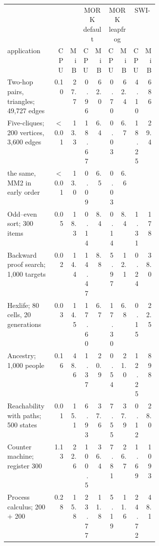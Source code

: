 \begin{center}
\small
\setlength{\tabcolsep}{3.5pt}
\begin{tabular}{@{}p{0.36\linewidth}rrrrrrrr@{}}
\toprule
 & \multicolumn{2}{c}{\CeTTa{}} & \multicolumn{2}{c}{MORK default} & \multicolumn{2}{c}{MORK leapfrog} & \multicolumn{2}{c}{SWI-\PeTTa{}} \\
\cmidrule(lr){2-3}\cmidrule(lr){4-5}\cmidrule(lr){6-7}\cmidrule(lr){8-9}
application & CPU & MiB & CPU & MiB & CPU & MiB & CPU & MiB \\
\midrule
Two-hop pairs, triangles; 49,727 edges & 0.10 & 27.7 & 0.96 & 62.0 & 0.70 & 62.4 & 4.10 & 686 \\
Five-cliques; 200 vertices, 3,600 edges & $<$0.01 & 13.3 & 18.67 & 6.4 & 0.03 & 6.7 & 18.25 & 29.4 \\
\quad the same, MM2 in early order & $<$0.01 & 13.0 & 0.09 & 6.5 & 0.03 & 6.6 &  &  \\
Odd--even sort; 300 items & 0.05 & 18.3 & 0.14 & 8.4 & 0.14 & 8.4 & 1.31 & 178 \\
Backward proof search; 1,000 targets & 0.02 & 14.4 & 14.47 & 8.8 & 5.97 & 12.1 & 0.24 & 38.0 \\
Hexlife; 80 cells, 20 generations & 0.03 & 14.5 & 17.60 & 6.7 & 17.30 & 6.8 & 0.15 & 22.5 \\
Ancestry; 1,000 people & 0.16 & 48.6 & 1.37 & 20.9 & 0.54 & 21.0 & 12.25 & 898 \\
Reachability with paths; 500 states & 0.01 & 15.1 & 6.93 & 37.6 & 7.55 & 37.9 & 0.12 & 28.0 \\
Counter machine; register 300 & 1.13 & 22.6 & 100.5 & 36.4 & 7.81 & 26.7 & 1.69 & 1093 \\
Process calculus; 200 $+$ 200 & 0.28 & 15.8 & 23.77 & 11.8 & 5.19 & 11.6 & 24.72 & 48.1 \\
\bottomrule
\end{tabular}
\end{center}

